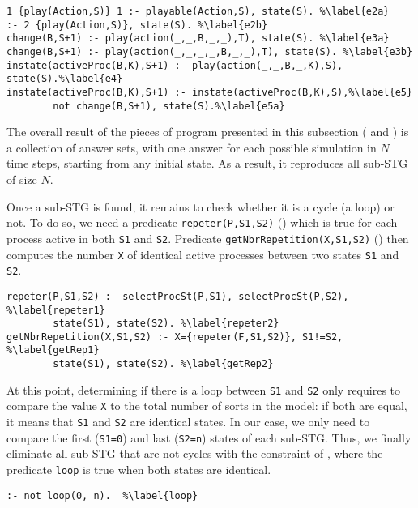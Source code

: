 \begin{lstlisting}
1 {play(Action,S)} 1 :- playable(Action,S), state(S). %\label{e2a} 
:- 2 {play(Action,S)}, state(S). %\label{e2b}
change(B,S+1) :- play(action(_,_,B,_,_),T), state(S). %\label{e3a}
change(B,S+1) :- play(action(_,_,_,_,B,_,_),T), state(S). %\label{e3b}
instate(activeProc(B,K),S+1) :- play(action(_,_,B,_,K),S), state(S).%\label{e4}
instate(activeProc(B,K),S+1) :- instate(activeProc(B,K),S),%\label{e5}
        not change(B,S+1), state(S).%\label{e5a}
\end{lstlisting}

The overall result of the pieces of program presented in this subsection
( and )
is a collection of answer sets,
with one answer for each possible simulation in $N$ time steps,
starting from any initial state.
As a result, it reproduces all sub-STG of size $N$.

Once a sub-STG is found, it remains to check whether it is a cycle (\ie a loop) or not.
To do so, we need a predicate \texttt{repeter(P,S1,S2)} () which is true for each process active in both \texttt{S1} and \texttt{S2}.
Predicate \texttt{getNbrRepetition(X,S1,S2)} () then computes the number \texttt{X} of identical active processes between two states \texttt{S1} and \texttt{S2}.
\begin{lstlisting}
repeter(P,S1,S2) :- selectProcSt(P,S1), selectProcSt(P,S2), %\label{repeter1}
        state(S1), state(S2). %\label{repeter2}
getNbrRepetition(X,S1,S2) :- X={repeter(F,S1,S2)}, S1!=S2, %\label{getRep1}
        state(S1), state(S2). %\label{getRep2}
\end{lstlisting}

At this point, determining if there is a loop between \texttt{S1} and \texttt{S2}
only requires to compare the value \texttt{X} to the total number of sorts in the model:
if both are equal, it means that \texttt{S1} and \texttt{S2} are identical states.
In our case, we only need to compare the first (\texttt{S1=0}) and last (\texttt{S2=n}) states of each sub-STG.
Thus, we finally eliminate all sub-STG that are not cycles with the constraint of ,
where the predicate \texttt{loop} is true when both states are identical.
\begin{lstlisting}
:- not loop(0, n).  %\label{loop}
\end{lstlisting}

